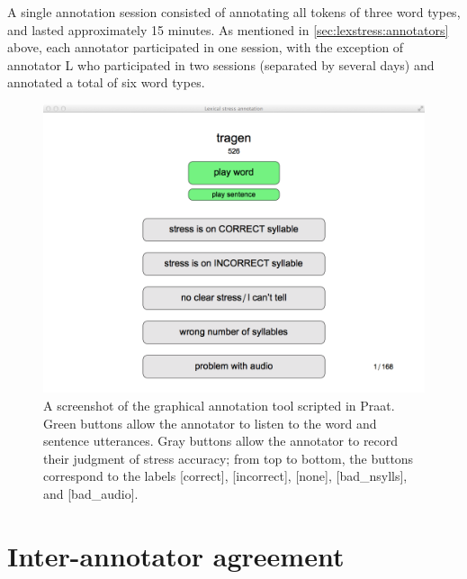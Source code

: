 A single annotation session consisted of annotating all tokens of three word types, and lasted approximately 15 minutes. As mentioned in \cref{sec:lexstress:annotators} above, each annotator participated in one session, with the exception of annotator L who participated in two sessions (separated by several days) and annotated a total of six word types.
	
		\begin{figure}[bht]
			\centering
			\includegraphics[width=\textwidth]{img/screenshots/AnnotationTool}
			\caption[A screenshot of the graphical annotation tool scripted in Praat.]{A screenshot of the graphical annotation tool scripted in Praat. Green buttons allow the annotator to listen to  the word and sentence utterances. Gray buttons allow the annotator to record their judgment of stress accuracy; from top to bottom, the buttons correspond to the labels [correct], [incorrect], [none], [bad\_nsylls], and [bad\_audio]. }
			\label{fig:annotationtool}
		\end{figure}
		
		
	
	\section{Inter-annotator agreement}
	\label{sec:lexstress:agreement}	
	
